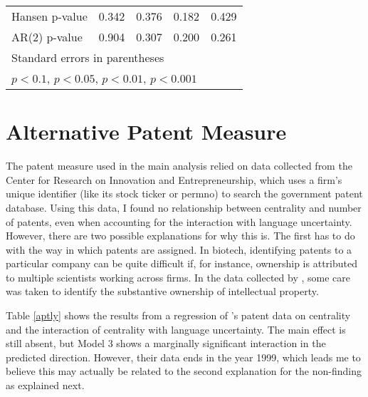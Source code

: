 \begin{table}
\begin{center}
{\begin{tabular}{l*{4}{c}}
Hansen p-value             &       0.342         &       0.376         &       0.182         &       0.429         \\
AR(2) p-value                &       0.904         &       0.307         &       0.200         &       0.261         \\
\hline\hline
\multicolumn{5}{l}{\footnotesize Standard errors in parentheses}\\
\multicolumn{5}{l}{\footnotesize \sym{+} \(p<0.1\), \sym{*} \(p<0.05\), \sym{**} \(p<0.01\), \sym{***} \(p<0.001\)}\\
\end{tabular}
}

\end{center}
\end{table}

\section{Alternative Patent Measure}

The patent measure used in the main analysis relied on data collected from the Center for Research on Innovation and Entrepreneurship, which uses a firm's unique identifier (like its stock ticker or permno) to search the government patent database. Using this data, I found no relationship between centrality and number of patents, even when accounting for the interaction with language uncertainty. However, there are two possible explanations for why this is. The first has to do with the way in which patents are assigned. In biotech, identifying patents to a particular company can be quite difficult if, for instance, ownership is attributed to multiple scientists working across firms. In the data collected by \citet{powell1999}, some care was taken to identify the substantive ownership of intellectual property.

Table \ref{aptly} shows the results from a regression of \citet{powell1999}'s patent data on centrality and the interaction of centrality with language uncertainty. The main effect is still absent, but Model 3 shows a marginally significant interaction in the predicted direction. However, their data ends in the year 1999, which leads me to believe this may actually be related to the second explanation for the non-finding as explained next.

